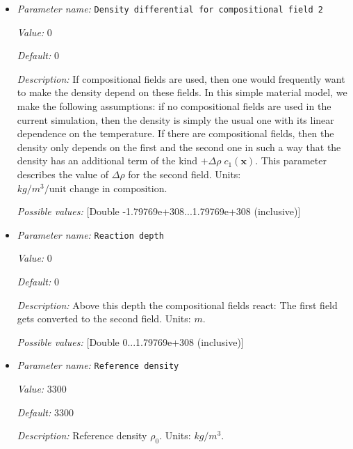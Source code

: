 \begin{itemize}
{\it Possible values:} [Double -1.79769e+308...1.79769e+308 (inclusive)]
\item {\it Parameter name:} {\tt Density differential for compositional field 2}
\label{parameters:Material model/Composition reaction model/Density differential for compositional field 2}


{\it Value:} 0


{\it Default:} 0


{\it Description:} If compositional fields are used, then one would frequently want to make the density depend on these fields. In this simple material model, we make the following assumptions: if no compositional fields are used in the current simulation, then the density is simply the usual one with its linear dependence on the temperature. If there are compositional fields, then the density only depends on the first and the second one in such a way that the density has an additional term of the kind $+\Delta \rho \; c_1(\mathbf x)$. This parameter describes the value of $\Delta \rho$ for the second field. Units: $kg/m^3/\textrm{unit change in composition}$.


{\it Possible values:} [Double -1.79769e+308...1.79769e+308 (inclusive)]
\item {\it Parameter name:} {\tt Reaction depth}
\label{parameters:Material model/Composition reaction model/Reaction depth}


{\it Value:} 0


{\it Default:} 0


{\it Description:} Above this depth the compositional fields react: The first field gets converted to the second field. Units: $m$.


{\it Possible values:} [Double 0...1.79769e+308 (inclusive)]
\item {\it Parameter name:} {\tt Reference density}
\label{parameters:Material model/Composition reaction model/Reference density}


{\it Value:} 3300


{\it Default:} 3300


{\it Description:} Reference density $\rho_0$. Units: $kg/m^3$.



\end{itemize}
